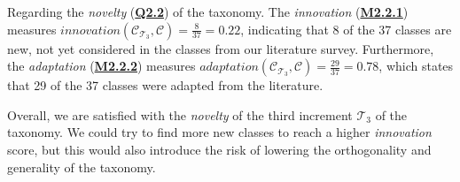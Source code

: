 \begin{sloppypar}
    Regarding the \emph{novelty} (\hyperref[tab:gqm_taxonomy_validation]{\textbf{Q2.2}}) of the taxonomy. The \emph{innovation} (\hyperref[tab:gqm_taxonomy_validation]{\textbf{M2.2.1}}) measures $innovation(\mathcal{C}_{\mathcal{T}_3}, \mathcal{C}) = \frac{8}{37} = 0.22$, indicating that 8 of the 37 classes are new, not yet considered in the classes from our literature survey. Furthermore, the \emph{adaptation} (\hyperref[tab:gqm_taxonomy_validation]{\textbf{M2.2.2}}) measures $adaptation(\mathcal{C}_{\mathcal{T}_3}, \mathcal{C}) = \frac{29}{37} = 0.78$, which states that 29 of the 37 classes were adapted from the literature.

    Overall, we are satisfied with the \emph{novelty} of the third increment $\mathcal{T}_3$ of the taxonomy. We could try to find more new classes to reach a higher \emph{innovation} score, but this would also introduce the risk of lowering the orthogonality and generality of the taxonomy.
\end{sloppypar}